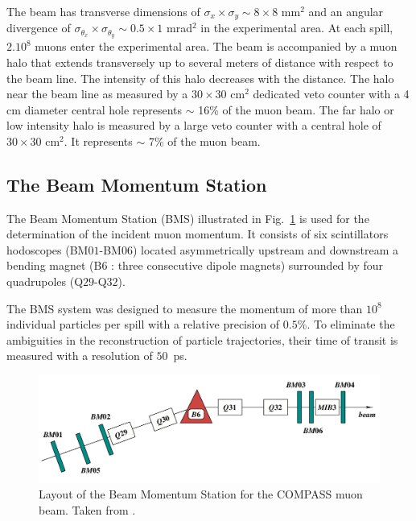 The beam has transverse dimensions of $\sigma_x \times \sigma_y \sim 8 \times 8 $ mm$^2$ and an angular divergence of $\sigma_{\theta_x} \times \sigma_{\theta_y} \sim 0.5 \times 1 $ mrad$^2$ in the experimental area. At each spill, $2.10^8$ muons enter the experimental area. The beam is accompanied by a muon halo that extends transversely up to several meters of distance with respect to the beam line. The intensity of this halo decreases with the distance. The halo near the beam line as measured by a $30 \times 30$ cm$^2$ dedicated veto counter with a 4 cm diameter central hole represents $\sim$ 16\% of the muon beam. The far halo or low intensity halo is measured by a large veto counter with a central hole of $30 \times 30$ cm$^2$. It represents $\sim$ 7\% of the muon beam.

\subsection{The Beam Momentum Station}

The Beam Momentum Station (BMS) illustrated in Fig.~\ref{pic:BMS} is used for the determination of the incident muon momentum. It consists of six scintillators hodoscopes (BM$01$-BM$06$) located asymmetrically upstream and downstream a bending magnet (B$6$ : three consecutive dipole magnets) surrounded by four quadrupoles (Q$29$-Q$32$).

The BMS system was designed to measure the momentum of more than $10^8$ individual particles per spill with a relative precision of $0.5$\%. To eliminate the ambiguities in the reconstruction of particle trajectories, their time of transit is measured with a resolution of $50$~ps.

\begin{figure}[!h]
  \centering
	\includegraphics[scale=0.5]{./gfx/BMS.png}
	\caption{Layout of the Beam Momentum Station for the COMPASS muon beam. Taken from \cite{NIM}.}
	\label{pic:BMS}
\end{figure}


